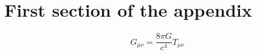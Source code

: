 \section{First section of the appendix}
\begin{equation}
    G_{\mu\nu}=\frac{8\pi G}{c^4}T_{\mu\nu}
\end{equation}




